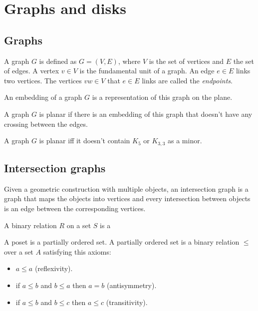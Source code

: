 \section{Graphs and disks}
\label{sec:graphs}


\subsection{Graphs}

A graph $G$ is defined as $G = (V,E)$, where $V$ is the set of vertices and $E$ the set of edges. A vertex $v \in V$ is the fundamental unit of a graph. An edge $e \in E$ links two vertices. The vertices $vw \in V$ that $e \in E$ links are called the \textit{endpoints}.

\begin{defn}
  An embedding of a graph $G$ is a representation of this graph on the plane.
\end{defn}

A graph $G$ is planar if there is an embedding of this graph that doesn't have any crossing between the edges.

\begin{theorem}[Kuratowski]
  A graph $G$ is planar iff it doesn't contain $K_5$ or $K_{3,3}$ as a minor.
\end{theorem}


\subsection{Intersection graphs}


Given a geometric construction with multiple objects, an intersection graph is a
graph that maps the objects into vertices and every intersection between objects
is an edge between the corresponding vertices.

\begin{defn}
  A binary relation $R$ on a set $S$ is a
\end{defn}

\begin{defn}
  A poset is a partially ordered set. A partially ordered set is a binary relation
  $\leq$ over a set $A$ satisfying this axioms:
  \begin{itemize}
    \item $a \leq a$ (reflexivity).
    \item if $a \leq b$ and $b \leq a$ then $a = b$ (antisymmetry).
    \item if $a \leq b$ and $b \leq c$ then $a \leq c$ (transitivity).
  \end{itemize}
\end{defn}


